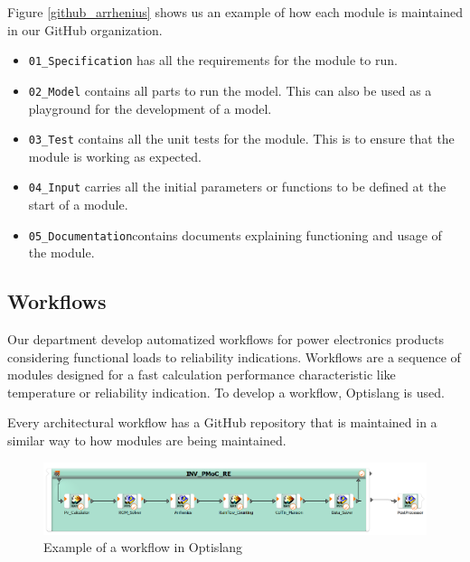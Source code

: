 Figure \ref{github_arrhenius} shows us an example of how each module is maintained in our GitHub organization.
\begin{itemize}
    \item \verb|01_Specification| has all the requirements for the module to run.
    \item \verb|02_Model| contains all parts to run the model. This can also be used as a playground for the development of a model.
    \item \verb|03_Test| contains all the unit tests for the module. This is to ensure that the module is working as expected.
    \item \verb|04_Input| carries all the initial parameters or functions to be defined at the start of a module.
    \item \verb|05_Documentation|contains documents explaining functioning and usage of the module.
\end{itemize}
\subsection{Workflows}
Our department develop automatized workflows for power electronics products considering functional loads to reliability indications. Workflows are a sequence
of modules designed for a fast calculation performance characteristic like temperature or reliability indication. To develop a workflow, Optislang is used.


Every architectural workflow has a GitHub repository that is maintained in a similar way to how modules are being maintained.

\begin{figure}[!h]
    \centering
    \includegraphics[width=\textwidth]{Images/workflow_example.png}
    \caption{Example of a workflow in Optislang}
    \label{workflow_example}
\end{figure}

